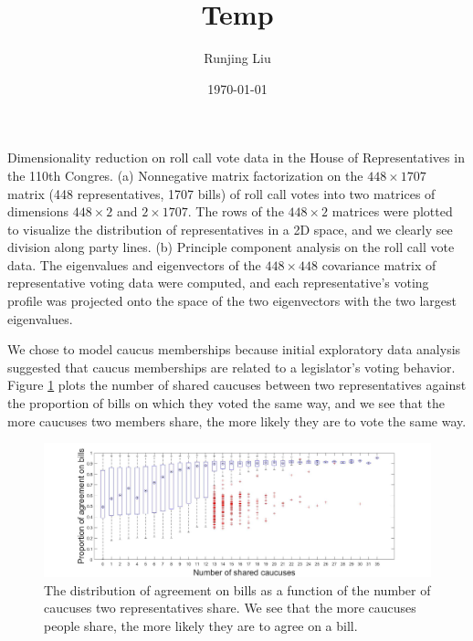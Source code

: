 \documentclass[a4paper]{article}
\title{Temp}
\author{Runjing Liu}
\date{\today}
\begin{document}
\maketitle


{Dimensionality reduction on roll call vote data in the House of Representatives in the 110th Congres. (a) Nonnegative matrix factorization on the $448\times 1707$ matrix (448 representatives, 1707 bills) of roll call votes into two matrices of dimensions $448\times 2$ and $2\times 1707$. The rows of the $448\times 2$ matrices were plotted to visualize the distribution of representatives in a 2D space, and we clearly see division along party lines. (b) Principle component analysis on the roll call vote data. The eigenvalues and eigenvectors of the $448\times 448$ covariance matrix of representative voting data were computed, and each representative's voting profile was projected onto the space of the two eigenvectors with the two largest eigenvalues.}


We chose to model caucus memberships because initial exploratory data analysis suggested that caucus memberships are related to a legislator's voting behavior. Figure \ref{fig:VotesVsCaucus} plots the number of shared caucuses between two representatives against the proportion of bills on which they voted the same way, and we see that the more caucuses two members share, the more likely they are to vote the same way. 

\begin{figure}[h]
  \centering
        \includegraphics[width=\textwidth]{Caucus_vs_Votes.jpg}
  \caption{The distribution of agreement on bills as a function of the number of caucuses two representatives share. We see that the more caucuses people share, the more likely they are to agree on a bill. }
          \label{fig:VotesVsCaucus}
\end{figure}
\end{document}
